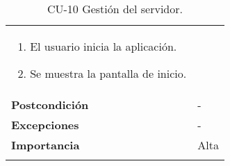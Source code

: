 \begin{longtable}[h!]{@{}ll@{}}
\begin{minipage}[t]{0.71\columnwidth}
\begin{enumerate}
\def\labelenumi{\arabic{enumi}.}
\tightlist
\item
  El usuario inicia la aplicación.
\item
  Se muestra la pantalla de inicio.
\end{enumerate}\strut
\end{minipage}\tabularnewline
\begin{minipage}[t]{0.23\columnwidth}\raggedright\strut
\textbf{Postcondición}\strut
\end{minipage} & \begin{minipage}[t]{0.71\columnwidth}\raggedright\strut
-\strut
\end{minipage}\tabularnewline
\begin{minipage}[t]{0.23\columnwidth}\raggedright\strut
\textbf{Excepciones}\strut
\end{minipage} & \begin{minipage}[t]{0.71\columnwidth}\raggedright\strut
-\strut
\end{minipage}\tabularnewline
\begin{minipage}[t]{0.23\columnwidth}\raggedright\strut
\textbf{Importancia}\strut
\end{minipage} & \begin{minipage}[t]{0.71\columnwidth}\raggedright\strut
Alta\strut
\end{minipage}\tabularnewline
\bottomrule
\caption{CU-10 Gestión del servidor.}
\end{longtable}


